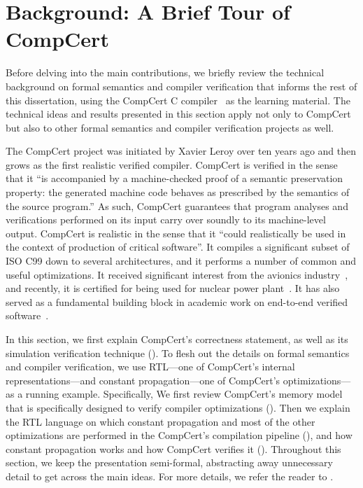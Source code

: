 \section{Background: A Brief Tour of CompCert}
\label{sec:background}

Before delving into the main contributions, we briefly review the technical background on formal
semantics and compiler verification that informs the rest of this dissertation, using the CompCert C
compiler~\cite{compcert} as the learning material.  The technical ideas and results presented in
this section apply not only to CompCert but also to other formal semantics and compiler verification
projects as well.

The CompCert project was initiated by Xavier Leroy over ten years ago and then grows as the first
realistic verified compiler.  CompCert is verified in the sense that it ``is accompanied by a
machine-checked proof of a semantic preservation property: the generated machine code behaves as
prescribed by the semantics of the source program.''  As such, CompCert guarantees that program
analyses and verifications performed on its input carry over soundly to its machine-level output.
CompCert is realistic in the sense that it ``could realistically be used in the context of
production of critical software''.  It compiles a significant subset of ISO C99 down to several
architectures, and it performs a number of common and useful optimizations.  It received significant
interest from the avionics industry~\cite{compcert-avionics,avionics}, and recently, it is certified
for being used for nuclear power plant~\cite{compcert-nuclear}.  It has also served as a fundamental
building block in academic work on end-to-end verified software~\cite{appel:plcc}.

In this section, we first explain CompCert's correctness statement, as well as its simulation
verification technique ().  To flesh out the details on formal
semantics and compiler verification, we use RTL---one of CompCert's internal representations---and
constant propagation---one of CompCert's optimizations---as a running example.  Specifically, We
first review CompCert's memory model that is specifically designed to verify compiler optimizations
().  Then we explain the RTL language on which constant propagation and
most of the other optimizations are performed in the CompCert's compilation pipeline
(), and how constant propagation works and how CompCert verifies it
().  Throughout this section, we keep the presentation semi-formal,
abstracting away unnecessary detail to get across the main ideas.  For more details, we refer the
reader to \cite{compcert, Leroy-Appel-Blazy-Stewart-memory-v2}.


